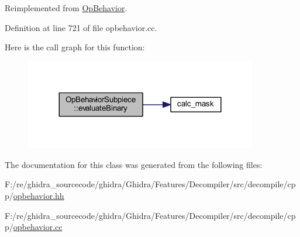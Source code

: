 Reimplemented from \mbox{\hyperlink{class_op_behavior_aeeed3af7aa35264b31a1f182884214a9}{Op\+Behavior}}.



Definition at line 721 of file opbehavior.\+cc.

Here is the call graph for this function\+:
\nopagebreak
\begin{figure}[H]
\begin{center}
\leavevmode
\includegraphics[width=287pt]{class_op_behavior_subpiece_a9935f52a58aeef8b4911c35388b91c3f_cgraph}
\end{center}
\end{figure}


The documentation for this class was generated from the following files\+:\begin{DoxyCompactItemize}
\item 
F\+:/re/ghidra\+\_\+sourcecode/ghidra/\+Ghidra/\+Features/\+Decompiler/src/decompile/cpp/\mbox{\hyperlink{opbehavior_8hh}{opbehavior.\+hh}}\item 
F\+:/re/ghidra\+\_\+sourcecode/ghidra/\+Ghidra/\+Features/\+Decompiler/src/decompile/cpp/\mbox{\hyperlink{opbehavior_8cc}{opbehavior.\+cc}}\end{DoxyCompactItemize}
